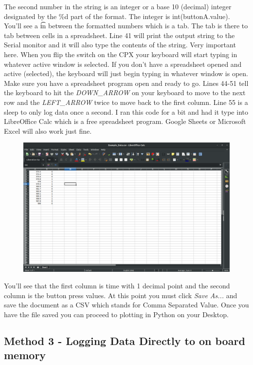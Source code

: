 The second number in the string is an integer or a base 10 (decimal)
integer designated by the \%d part of the format. The integer is
int(buttonA.value). You’ll see a \t in between the formatted numbers
which is a tab. The tab is there to tab between cells in a
spreadsheet. Line 41 will print the output string to the Serial
monitor and it will also type the contents of the string. Very
important here. When you flip the switch on the CPX your keyboard will
start typing in whatever active window is selected. If you don’t have
a spreadsheet opened and active (selected), the keyboard will just
begin typing in whatever window is open. Make sure you have a
spreadsheet program open and ready to go. Lines 44-51 tell the
keyboard to hit the {\it DOWN\_ARROW} on your keyboard to move to the next
row and the {\it LEFT\_ARROW} twice to move back to the first column. Line 55
is a sleep to only log data once a second. I ran this code for a bit
and had it type into LibreOffice Calc which is a free spreadsheet
program. Google Sheets or Microsoft Excel will also work just fine. 
\begin{figure}[H]
  \begin{center}
    \includegraphics[width=\textwidth]{Figures/Typing3.png}
  \end{center}
\end{figure}
You’ll see that the first column is time with 1 decimal point and the
second column is the button press values. At this point you must click
{\it Save As...} and save the document as a CSV which stands for Comma
Separated Value. Once you have the file saved you can proceed to
plotting in Python on your Desktop. 

\subsection{Method 3 - Logging Data Directly to on board memory}

